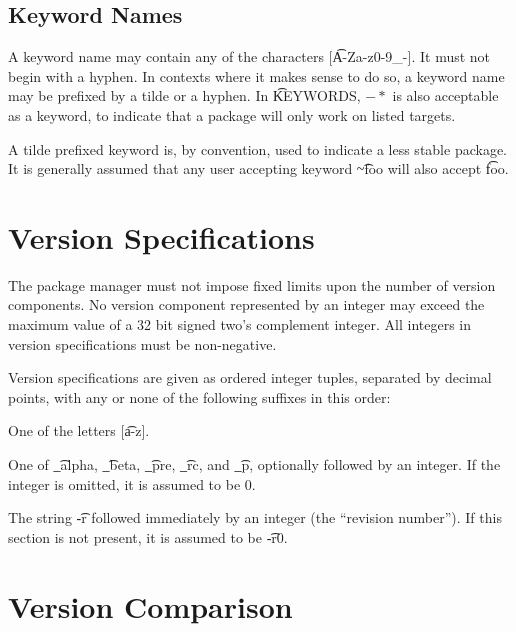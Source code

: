 \subsection{Keyword Names}
\label{keyword-names}
A keyword name may contain any of the characters [\t{A-Za-z0-9\_-}]. It must not begin with a
hyphen. In contexts where it makes sense to do so, a keyword name may be prefixed by
a tilde or a hyphen. In \t{KEYWORDS}, $-*$ is also acceptable as a keyword, to indicate that
a package will only work on listed targets.

A tilde prefixed keyword is, by convention, used to indicate a less stable package. It is generally
assumed that any user accepting keyword \t{\textasciitilde{}foo} will also accept \t{foo}.

\section{Version Specifications}
The package manager must not impose fixed limits upon the number of version components. No version
component represented by an integer may exceed the maximum value of a 32 bit signed two's complement
integer. All integers in version specifications must be non-negative.

Version specifications are given as ordered integer tuples, separated by decimal points, with any or
none of the following suffixes in this order:
\begin{bulletlist}
\item One of the letters [\t{a-z}].
\item One of \t{\_alpha}, \t{\_beta}, \t{\_pre}, \t{\_rc}, and \t{\_p}, optionally followed by an
    integer. If the integer is omitted, it is assumed to be 0.
\item The string \t{-r} followed immediately by an integer (the ``revision number''). If this section
    is not present, it is assumed to be \t{-r0}.
\end{bulletlist}



\section{Version Comparison}

